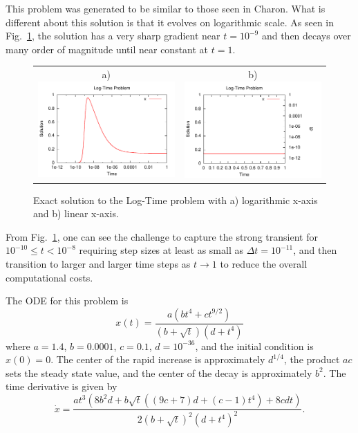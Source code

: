 This problem was generated to be similar to those seen in Charon.
What is different about this solution is that it evolves on logarithmic
scale. As seen in Fig.~\ref{rythmos:fig:LogTime-exact}, the solution
has a very sharp gradient near $t=10^{-9}$ and then decays over many
order of magnitude until near constant at $t=1$.
\begin{figure}
\centering{}%
\begin{tabular}{cc}
a)\includegraphics[width=2.75in]{figures/logtime-log} & b)\includegraphics[width=2.75in]{figures/logtime-linear}\tabularnewline
\end{tabular}\caption{Exact solution to the Log-Time problem with a) logarithmic x-axis
and b) linear x-axis.\label{rythmos:fig:LogTime-exact}}
\end{figure}
From Fig.~\ref{rythmos:fig:LogTime-exact}, one can see the challenge
to capture the strong transient for $10^{-10}\leq t<10^{-8}$ requiring
step sizes at least as small as $\Delta t=10^{-11}$, and then transition
to larger and larger time steps as $t\rightarrow1$ to reduce the
overall computational costs.

The ODE for this problem is
\[
x(t)=\frac{a\left(bt^{4}+ct^{9/2}\right)}{\left(b+\sqrt{t}\right)\left(d+t^{4}\right)}
\]
where $a=1.4$, $b=0.0001$, $c=0.1$, $d=10^{-36}$, and the initial
condition is $x(0)=0.$ The center of the rapid increase is approximately
$d^{1/4}$, the product $ac$ sets the steady state value, and the
center of the decay is approximately $b^{2}$. The time derivative
is given by
\[
\dot{x}=\frac{at^{3}\left(8b^{2}d+b\sqrt{t}\left((9c+7)d+(c-1)t^{4}\right)+8cdt\right)}{2\left(b+\sqrt{t}\right)^{2}\left(d+t^{4}\right)^{2}}.
\]

